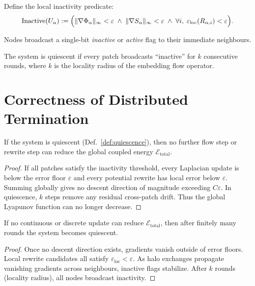 Define the local inactivity predicate:
\[
\mathrm{Inactive}(U_\alpha) :=
  \Bigl(
    \|\nabla\Phi_\alpha\|_\infty < \varepsilon
    \;\wedge\;
    \|\nabla S_\alpha\|_\infty < \varepsilon
    \;\wedge\;
    \forall i,\; \varepsilon_{\mathrm{loc}}(R_{\alpha,i})<\varepsilon
  \Bigr).
\]

Nodes broadcast a single-bit \emph{inactive} or \emph{active} flag  
to their immediate neighbours.

\begin{definition}
\label{def:quiescence}
The system is quiescent if every patch broadcasts ``inactive''  
for $k$ consecutive rounds,  
where $k$ is the locality radius of the embedding flow operator.
\end{definition}

\section{Correctness of Distributed Termination}

\begin{theorem}
\label{thm:quiescence-sound}
If the system is quiescent (Def.~\ref{def:quiescence}),  
then no further flow step or rewrite step  
can reduce the global coupled energy $\mathcal{E}_\mathrm{total}$.
\end{theorem}

\begin{proof}
If all patches satisfy the inactivity threshold,
every Laplacian update is below the error floor $\varepsilon$  
and every potential rewrite has local error below $\varepsilon$.  
Summing globally gives no descent direction of magnitude  
exceeding $C\varepsilon$.  
In quiescence, $k$ steps remove any residual cross-patch drift.  
Thus the global Lyapunov function can no longer decrease.
\end{proof}

\begin{theorem}
\label{thm:quiescence-complete}
If no continuous or discrete update can reduce  
$\mathcal{E}_\mathrm{total}$,  
then after finitely many rounds the system becomes quiescent.
\end{theorem}

\begin{proof}
Once no descent direction exists, gradients vanish outside of error floors.  
Local rewrite candidates all satisfy $\varepsilon_{\mathrm{loc}}<\varepsilon$.  
As halo exchanges propagate vanishing gradients across neighbours,  
inactive flags stabilize.  
After $k$ rounds (locality radius),  
all nodes broadcast inactivity.
\end{proof}

